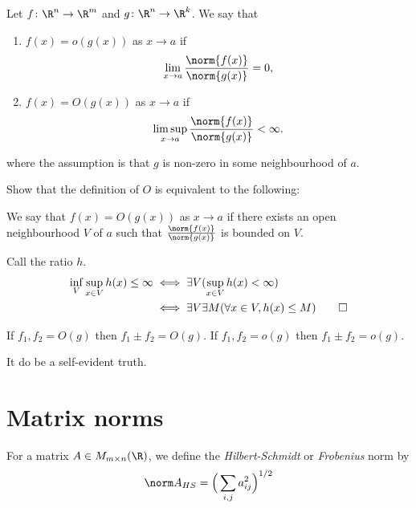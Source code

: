 \begin{definition*}[$O$ notation] \label{def:o}
    Let $f\colon \R^n \to \R^m$ and $g\colon \R^n \to \R^k$.
    We say that
    \begin{enumerate}
        \item $f(x) = o(g(x))$ as $x \to a$ if \[
            \lim_{x \to a} \frac{\norm{f(x)}}{\norm{g(x)}} = 0,
        \]
        \item $f(x) = O(g(x))$ as $x \to a$ if \[
            \limsup_{x \to a} \frac{\norm{f(x)}}{\norm{g(x)}} < \infty.
        \]
    \end{enumerate}
    where the assumption is that $g$ is non-zero in some
    neighbourhood of $a$.
\end{definition*}

\begin{exercise}
    Show that the definition of $O$ is equivalent to the following:

    We say that $f(x) = O(g(x))$ as $x \to a$ if there exists an open
    neighbourhood $V$ of $a$ such that $\frac{\norm{f(x)}}{\norm{g(x)}}$
    is bounded on $V$.
\end{exercise}
\begin{solution}
    Call the ratio $h$.
    \begin{align*}
        \inf_V \sup_{x \in V} h(x) \le \infty
            &\iff \exists V (\sup_{x \in V} h(x) < \infty) \\
            &\iff \exists V \exists M (\forall x \in V, h(x) \le M) \qedhere
    \end{align*}
\end{solution}

\begin{exercise}
    If $f_1, f_2 = O(g)$ then $f_1 \pm f_2 = O(g)$.
    If $f_1, f_2 = o(g)$ then $f_1 \pm f_2 = o(g)$.
\end{exercise}
\begin{solution}
    It do be a self-evident truth.
\end{solution}

\section{Matrix norms} \label{sec:matrix-norms}

\begin{definition*} \label{def:hsn}
    For a matrix $A \in M_{m \times n}(\R)$, we define the
    \emph{Hilbert-Schmidt} or \emph{Frobenius} norm by \[
        \hsn A = \Big(\sum_{i,j} a_{ij}^2\Big)^{1/2}
    \]
\end{definition*}

